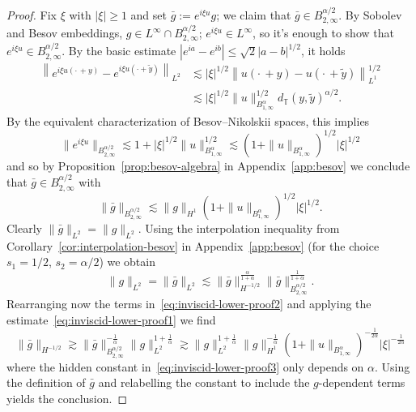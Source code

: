 \documentclass[11pt,oneside,reqno]{amsart}
\newcommand{\assign}{:=}
\numberwithin{equation}{section}
\begin{document}
\begin{proof}
  Fix $\xi$ with $| \xi | \geqslant 1$ and set $\bar{g} \assign e^{i \xi u}
  g$; we claim that $\bar{g} \in B^{\alpha / 2}_{2, \infty}$. By Sobolev and
  Besov embeddings, $g \in L^{\infty} \cap B^{\alpha / 2}_{2, \infty}$; $e^{i
  \xi u} \in L^{\infty}$, so it's enough to show that $e^{i \xi u} \in
  B^{\alpha / 2}_{2, \infty}$. By the basic estimate $| e^{i a} - e^{i b} |
  \leqslant \sqrt{2}  | a - b |^{1 / 2}$, it holds
%
  \begin{align*}
    \left\| e^{i \xi u \left( \cdot \, + y \right)} - e^{i \xi u (\cdot +
    \tilde{y})} \right\|_{L^2} & \lesssim | \xi |^{1 / 2} \left\| u \left(
    \cdot \, + y \right) - u \left( \cdot \, + \tilde{y} \right)
    \right\|_{L^1}^{1 / 2}\\
    & \lesssim | \xi |^{1 / 2} \| u \|^{1 / 2}_{B^{\alpha}_{1, \infty}}
    d_{\mathbb{T}} (y, \tilde{y})^{\alpha / 2} .
  \end{align*}
%  
  By the equivalent characterization of Besov--Nikolskii spaces, this implies
  \[ \| e^{i \xi u} \|_{B^{\alpha / 2}_{2, \infty}} \lesssim 1 + | \xi |^{1 /
     2} \| u \|^{1 / 2}_{B^{\alpha}_{1, \infty}} \lesssim (1 + \| u
     \|_{B^{\alpha}_{1, \infty}})^{1 / 2} | \xi |^{1 / 2} \]
  and so by Proposition~\ref{prop:besov-algebra} in Appendix~\ref{app:besov}
  we conclude that $\bar{g} \in B^{\alpha / 2}_{2, \infty}$ with
  \begin{equation}
    \| \bar{g} \|_{B^{\alpha / 2}_{2, \infty}} \lesssim \| g \|_{H^1} (1 + \|
    u \|_{B^{\alpha}_{1, \infty}})^{1 / 2} | \xi |^{1 / 2} .
    \label{eq:inviscid-lower-proof1}
  \end{equation}
  Clearly $\| \bar{g} \|_{L^2} = \| g \|_{L^2}$. Using the interpolation
  inequality from Corollary~\ref{cor:interpolation-besov} in
  Appendix~\ref{app:besov} (for the choice $s_1 = 1 / 2$, $s_2 = \alpha / 2$)
  we obtain
  \begin{equation}
    \| g \|_{L^2} = \| \bar{g} \|_{L^2} \lesssim \| \bar{g} \|_{H^{- 1 /
    2}}^{\frac{\alpha}{1 + \alpha}}  \| \bar{g} \|_{B^{\alpha / 2}_{2,
    \infty}}^{\frac{1}{1 + \alpha}} . \label{eq:inviscid-lower-proof2}
  \end{equation}
  Rearranging now the terms in~\eqref{eq:inviscid-lower-proof2} and applying
  the estimate~\eqref{eq:inviscid-lower-proof1} we find
  \begin{equation}
      \| \bar{g} \|_{H^{- 1 / 2}} \gtrsim \| \bar{g} \|_{B^{\alpha /
      2}_{2, \infty}}^{- \frac{1}{\alpha}}  \| g \|_{L^2}^{1 +
      \frac{1}{\alpha}}
      \gtrsim \| g \|_{L^2}^{1 + \frac{1}{\alpha}} \| g \|_{H^1}^{-\frac{1}{\alpha}} (1 + \| u \|_{B^{\alpha}_{1, \infty}})^{- \frac{1}{2
      \alpha}} | \xi |^{- \frac{1}{2 \alpha}} \label{eq:inviscid-lower-proof3}
  \end{equation}
  where the hidden constant in~\eqref{eq:inviscid-lower-proof3} only depends
  on $\alpha$. Using the definition of $\bar{g}$ and relabelling the constant
  to include the $g$-dependent terms yields the conclusion.
\end{proof}
\end{document}

